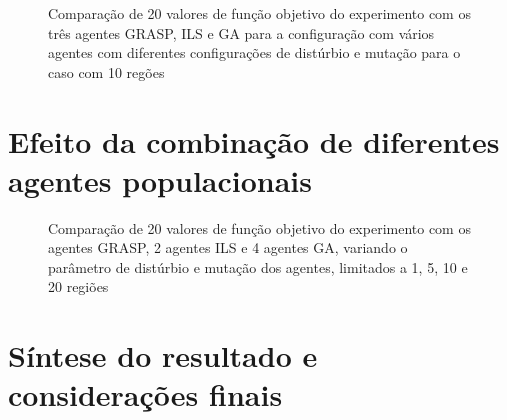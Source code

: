 \begin{figure}
    \centering
    
    \caption{Comparação de 20 valores de função objetivo do experimento com os três agentes GRASP, ILS e GA para a configuração com vários agentes com diferentes configurações de distúrbio e mutação para o caso com 10 regões}
    \label{fig:A0A02boxplot}
\end{figure}

\section{Efeito da combinação de diferentes agentes populacionais}
\label{sec:diversidade}

\begin{figure}
    \centering
    
    \caption{Comparação de 20 valores de função objetivo do experimento com os agentes GRASP, 2 agentes ILS e 4 agentes GA, variando o parâmetro de distúrbio e mutação dos agentes, limitados a 1, 5, 10 e 20 regiões}
    \label{fig:A02boxplot}
\end{figure}

\section{Síntese do resultado e considerações finais}
\label{sec:sinteseDiversidade}



